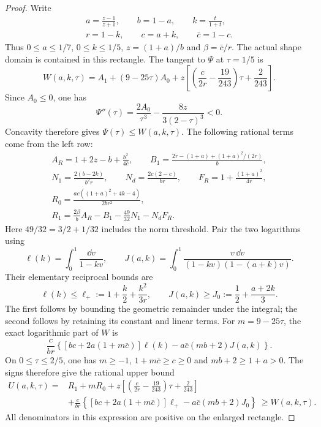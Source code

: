 \begin{proof}
Write
\begin{gather*}
 a=\frac{z-1}{z+1},\qquad b=1-a,\qquad k=\frac{t}{1+t},\\
 r=1-k,\qquad c=a+k,\qquad \bar c=1-c.
\end{gather*}
Thus $0\le a\le1/7$, $0\le k\le1/5$, $z=(1+a)/b$ and
$\beta=\bar c/r$. The actual shape domain is contained in this rectangle.
The tangent to $\Psi$ at $\tau=1/5$ is
\[
 W(a,k,\tau)=A_1+(9-25\tau)A_0
       +z\left[\left(\frac{c}{2r}-\frac{19}{243}\right)\tau
                        +\frac{2}{243}\right].
\]
Since $A_0\le0$, one has
\[
 \Psi''(\tau)=\frac{2A_0}{\tau^3}-\frac{8z}{3(2-\tau)^3}<0.
\]
Concavity therefore gives $\Psi(\tau)\le W(a,k,\tau)$.
The following rational terms come from the left row:
\begin{gather*}
 A_R=1+2z-b+\frac{b^2}{4\bar c},\qquad
 B_1=\frac{2r-(1+a)+(1+a)^2/(2r)}b,\\
 N_1=\frac{2(b-2k)}{b^2r},\qquad
 N_d=\frac{2c(2-c)}{br},\qquad F_R=1+\frac{(1+a)^2}{4r},\\
 R_0=\frac{ac((1+a)^2+4k-4)}{2br^2},\\
 R_1=\frac{2\beta}{b}A_R-B_1-\frac{49}{32}N_1-N_dF_R.
\end{gather*}
Here $49/32=3/2+1/32$ includes the norm threshold.
Pair the two logarithms using
\[
 \ell(k)=\int_0^1\frac{\dd v}{1-kv},\qquad
 J(a,k)=\int_0^1\frac{v\,\dd v}{(1-kv)(1-(a+k)v)}.
\]
Their elementary reciprocal bounds are
\[
 \ell(k)\le\ell_+:=1+\frac k2+\frac{k^2}{3r},\qquad
 J(a,k)\ge J_0:=\frac12+\frac{a+2k}{3}.
\]
The first follows by bounding the geometric remainder under the integral;
the second follows by retaining its constant and linear terms.
For $m=9-25\tau$, the exact logarithmic part of $W$ is
\[
 \frac c{br}\left\{
 [bc+2a(1+m\bar c)]\ell(k)-a\bar c(mb+2)J(a,k)\right\}.
\]
On $0\le\tau\le2/5$, one has $m\ge-1$,
$1+m\bar c\ge c\ge0$ and $mb+2\ge1+a>0$.
The signs therefore give the rational upper bound
\begin{align*}
 U(a,k,\tau)
 ={}&R_1+mR_0
      +z\left[\left(\frac c{2r}-\frac{19}{243}\right)\tau
                        +\frac2{243}\right]\\
 &+\frac c{br}\left\{
 [bc+2a(1+m\bar c)]\ell_+-a\bar c(mb+2)J_0\right\}
 \ \ge W(a,k,\tau).
\end{align*}
All denominators in this expression are positive on the enlarged rectangle.



\end{proof}
